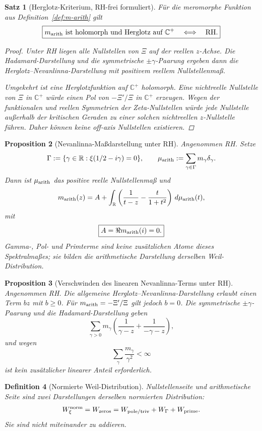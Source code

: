 \documentclass[11pt,a4paper]{amsart}
\newtheorem{theorem}{Satz}[section]
\newtheorem{proposition}[theorem]{Proposition}
\newtheorem{definition}[theorem]{Definition}
\newcommand{\RH}{\mathrm{RH}}
\begin{document}
\begin{theorem}[Herglotz-Kriterium, RH-frei formuliert]
\label{thm:herglotz-rh}
Für die meromorphe Funktion aus Definition~\ref{def:m-arith} gilt
\[
  \boxed{
  m_{\rm arith}\text{ ist holomorph und Herglotz auf }\mathbb C^+
  \quad\Longleftrightarrow\quad
  \RH.}
\]
\begin{proof}
Unter RH liegen alle Nullstellen von $\Xi$ auf der reellen $z$-Achse.
Die Hadamard-Darstellung und die symmetrische $\pm\gamma$-Paarung ergeben
dann die Herglotz--Nevanlinna-Darstellung mit positivem reellem Nullstellenmaß.

Umgekehrt ist eine Herglotzfunktion auf $\mathbb C^+$ holomorph. Eine
nichtreelle Nullstelle von $\Xi$ in $\mathbb C^+$ würde einen Pol von
$-\Xi'/\Xi$ in $\mathbb C^+$ erzeugen. Wegen der funktionalen und reellen
Symmetrien der Zeta-Nullstellen würde jede Nullstelle außerhalb der kritischen
Geraden zu einer solchen nichtreellen $z$-Nullstelle führen. Daher können
keine off-axis Nullstellen existieren.
\end{proof}
\end{theorem}

\begin{proposition}[Nevanlinna-Maßdarstellung unter RH]
\label{prop:rh-nevanlinna}
Angenommen RH. Setze
\[
  \Gamma:=\{\gamma\in\mathbb R:\xi(1/2-i\gamma)=0\},
  \qquad
  \mu_{\rm arith}:=\sum_{\gamma\in\Gamma}m_\gamma\delta_\gamma.
\]
Dann ist $\mu_{\rm arith}$ das positive reelle Nullstellenmaß und
\[
  m_{\rm arith}(z)
  =A+\int_{\mathbb R}
  \left(\frac1{t-z}-\frac{t}{1+t^2}\right)\,d\mu_{\rm arith}(t),
\]
mit
\[
  \boxed{A=\Re m_{\rm arith}(i)=0.}
\]
Gamma-, Pol- und Primterme sind keine zusätzlichen Atome dieses Spektralmaßes;
sie bilden die arithmetische Darstellung derselben Weil-Distribution.
\end{proposition}

\begin{proposition}[Verschwinden des linearen Nevanlinna-Terms unter RH]
\label{prop:b-zero}
Angenommen RH. Die allgemeine Herglotz--Nevanlinna-Darstellung erlaubt einen
Term $bz$ mit $b\ge0$. Für $m_{\rm arith}=-\Xi'/\Xi$ gilt jedoch $b=0$.
Die symmetrische $\pm\gamma$-Paarung und die Hadamard-Darstellung geben
\[
  \sum_{\gamma>0}m_\gamma
  \left(\frac1{\gamma-z}+\frac1{-\gamma-z}\right),
\]
und wegen
\[
  \sum_\gamma\frac{m_\gamma}{\gamma^2}<\infty
\]
ist kein zusätzlicher linearer Anteil erforderlich.
\end{proposition}

\begin{definition}[Normierte Weil-Distribution]\label{def:weil-distribution}
Nullstellenseite und arithmetische Seite sind zwei Darstellungen derselben
normierten Distribution:
\[
  W_\xi^{\rm norm}
  =W_{\rm zeros}
  =W_{\rm pole/triv}+W_\Gamma+W_{\rm prime}.
\]
Sie sind nicht miteinander zu addieren.
\end{definition}
\end{document}
